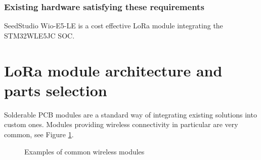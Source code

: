 \subsubsection{Existing hardware satisfying these requirements}
SeedStudio Wio-E5-LE \cite{stmicroelectronics_lora_2024, seeedstudio_wio-e5-wireless_2024} is a cost effective LoRa module integrating the STM32WLE5JC SOC.

\section{\label{section:module-architecture}LoRa module architecture and parts selection}
Solderable PCB modules are a standard way of integrating existing solutions into custom ones. Modules providing wireless connectivity in particular are very common, see Figure \ref{fig:wireless-modules}.

\begin{figure}
    \centering
    \caption{\label{fig:wireless-modules} Examples of common wireless modules}
\end{figure}

